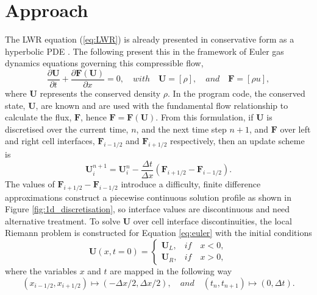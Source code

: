 \chapter{Approach}
\label{ch:approach}
\graphicspath{{image_directory/approach/}}

	The LWR equation (\ref{eq:LWR}) is already presented in conservative form as a hyperbolic PDE \cite{Toro09}. The following present this in the framework of Euler gas dynamics equations governing this compressible flow,
	\begin{equation}
		\frac{\partial\mathbf{U}}{\partial t}+\frac{\partial\mathbf{F}(\mathbf{U})}{\partial x}=0, 
		\quad
		with
		\quad
		\mathbf{U}=\left[\rho\right], 
		\quad and \quad
		\mathbf{F}=\left[\rho u\right],		
		\label{eq:euler}
	\end{equation}
	where $\mathbf{U}$ represents the conserved density $\rho$. In the program code, the conserved state, $\mathbf{U}$, are known and are used with the fundamental flow relationship to calculate the flux, $\mathbf{F}$, hence $\mathbf{F}=\mathbf{F}(\mathbf{U})$. From this formulation, if $\mathbf{U}$ is discretised over the current time, $n$, and the next time step $n+1$, and $\mathbf{F}$ over left and right cell interfaces, $\mathbf{F}_{i-1/2}$ and $\mathbf{F}_{i+1/2}$ respectively, then an update scheme is
	\begin{equation}
		\mathbf{U}_i^{n+1}=\mathbf{U}_i^n-\frac{\Delta t}{\Delta x}\left(\mathbf{F}_{i+1/2}-\mathbf{F}_{i-1/2}\right).\nonumber
	\end{equation}
	The values of $\mathbf{F}_{i+1/2}-\mathbf{F}_{i-1/2}$ introduce a difficulty, finite difference approximations construct a piecewise continuous solution profile as shown in Figure \ref{fig:1d_discretisation}, so interface values are discontinuous and need alternative treatment. To solve $\mathbf{U}$ over cell interface discontinuities, the local Riemann problem is constructed for Equation \ref{eq:euler} with the initial conditions
	\begin{equation}
		\mathbf{U}(x,t=0)=
		\begin{cases}
			\mathbf{U}_L, & if \quad x<0,\\
			\mathbf{U}_R, & if \quad x>0,
		\end{cases}
		\label{eq:init_con}
	\end{equation}
	where the variables $x$ and $t$ are mapped in the following way
	\begin{equation}
		(x_{i-1/2},x_{i+1/2})\mapsto(-\Delta x/2,\Delta x/2), 
		\quad
		and
		\quad
		(t_n,t_{n+1})\mapsto(0,\Delta t).
		\label{eq:local_scale}
	\end{equation}
